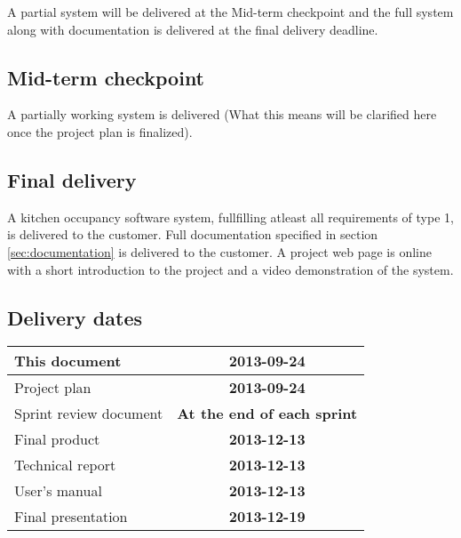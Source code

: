 A partial system will be delivered at the Mid-term checkpoint and the full system along with documentation is delivered at the final delivery deadline.

\subsection{Mid-term checkpoint}
A partially working system is delivered (What this means will be clarified here once the project plan is finalized).

\subsection{Final delivery}
A kitchen occupancy software system, fullfilling atleast all requirements of type 1, is delivered to the customer.
Full documentation specified in section \ref{sec:documentation} is delivered to the customer.
A project web page is online with a short introduction to the project and a video demonstration of the system.

\subsection{Delivery dates}
\label{sec:delivery_req}
\begin{center}
	\begin{Large}
	\begin{tabular}{|p{10.5cm}|c|}
		\hline
		\large{This document} & \large{\textbf{2013-09-24}} \\
		\hline
		\large{Project plan} & \large{\textbf{2013-09-24}} \\
		\hline
		\large{Sprint review document} & \large{\textbf{At the end of each sprint}} \\
		\hline
		\large{Final product} & \large{\textbf{2013-12-13}} \\
		\hline
		\large{Technical report} & \large{\textbf{2013-12-13}} \\
		\hline
		\large{User's manual} & \large{\textbf{2013-12-13}} \\
		\hline
		\large{Final presentation} & \large{\textbf{2013-12-19}} \\
		\hline	
		
	\end{tabular}
	\end{Large}
\end{center}